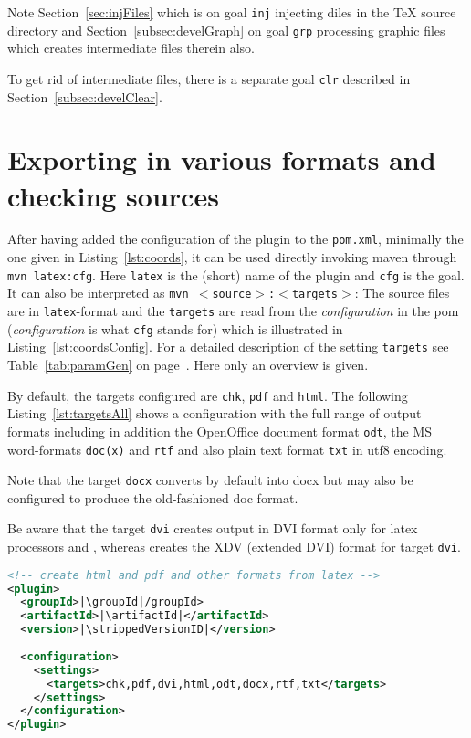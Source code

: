 Note Section~\ref{sec:injFiles}  which is on goal \texttt{inj} 
injecting diles in the \TeX{} source directory and 
Section~\ref{subsec:develGraph} on goal \texttt{grp} 
processing graphic files which creates intermediate files therein also. 

To get rid of intermediate files, there is a separate goal \texttt{clr} 
described in Section~\ref{subsec:develClear}. 




\section{Exporting in various formats and checking sources}\label{sec:outputFormats}



After having added the configuration of the plugin to the \texttt{pom.xml},
minimally the one given in Listing~\ref{lst:coords},
it can be used directly invoking maven through 
\texttt{mvn latex:cfg}. 
Here \texttt{latex} is the (short) name of the plugin 
and \texttt{cfg} is the goal. 
It can also be interpreted as \texttt{mvn $<$source$>$:$<$targets$>$}: 
The source files are in \texttt{latex}-format and the \texttt{targets} 
are read from the \emph{configuration} in the pom 
(\emph{configuration} is what \texttt{cfg} stands for) 
which is illustrated in Listing~\ref{lst:coordsConfig}. 
For a detailed description of the setting \texttt{targets} 
see Table~\ref{tab:paramGen} on page~\pageref{tab:paramGen}. 
Here only an overview is given. 

By default, the targets configured are \texttt{chk}, \texttt{pdf} and \texttt{html}. 
The following Listing~\ref{lst:targetsAll} shows a configuration 
with the full range of output formats including in addition 
the OpenOffice document format \texttt{odt}, 
the MS word-formats \texttt{doc(x)} and \texttt{rtf} %
and also plain text format \texttt{txt} in utf8 encoding. 

Note that the target \texttt{docx} converts by default into \gls{docx} 
but may also be configured to produce the old-fashioned \gls{doc} format. 

Be aware that the target \texttt{dvi} creates output in DVI format 
only for latex processors \lualatex{} and \pdflatex{}, 
whereas \xelatex{} creates the XDV (extended DVI) format for target \texttt{dvi}. 

\begin{lstlisting}[language=xml, basicstyle=\small,
escapechar=|,
float, captionpos=b, label={lst:targetsAll}, 
caption={Configuration with full range output formats}]
<!-- create html and pdf and other formats from latex -->
<plugin>
  <groupId>|\groupId|/groupId>
  <artifactId>|\artifactId|</artifactId>
  <version>|\strippedVersionID|</version>
	
  <configuration>
    <settings>
      <targets>chk,pdf,dvi,html,odt,docx,rtf,txt</targets>
    </settings>
  </configuration>
</plugin>
\end{lstlisting}

